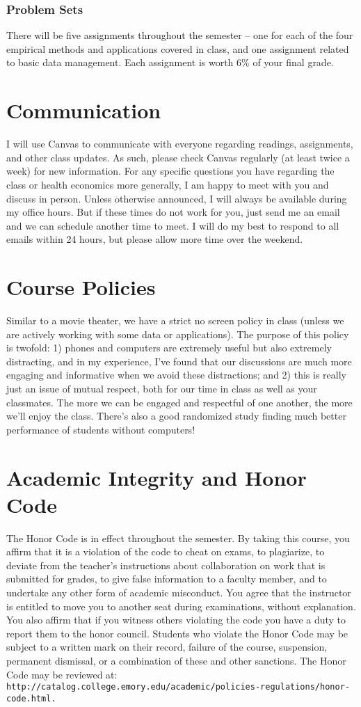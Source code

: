 \documentclass{article}
\begin{document}
\subsubsection*{Problem Sets}
There will be five assignments throughout the semester -- one for each of the four empirical methods and applications covered in class, and one assignment related to basic data management. Each assignment is worth 6\% of your final grade.

\section*{Communication}
I will use Canvas to communicate with everyone regarding readings, assignments, and other class updates. As such, please check Canvas regularly (at least twice a week) for new information. For any specific questions you have regarding the class or health economics more generally, I am happy to meet with you and discuss in person. Unless otherwise announced, I will always be available during my office hours. But if these times do not work for you, just send me an email and we can schedule another time to meet. I will do my best to respond to all emails within 24 hours, but please allow more time over the weekend.

\section*{Course Policies}
Similar to a movie theater, we have a strict no screen policy in class (unless we are actively working with some data or applications). The purpose of this policy is twofold: 1) phones and computers are extremely useful but also extremely distracting, and in my experience, I've found that our discussions are much more engaging and informative when we avoid these distractions; and 2) this is really just an issue of mutual respect, both for our time in class as well as your classmates. The more we can be engaged and respectful of one another, the more we'll enjoy the class. There's also a good randomized study finding much better performance of students without computers!

\section*{Academic Integrity and Honor Code}
The Honor Code is in effect throughout the semester. By taking this course, you affirm that it is a violation of the code to cheat on exams, to plagiarize, to deviate from the teacher's instructions about collaboration on work that is submitted for grades, to give false information to a faculty member, and to undertake any other form of academic misconduct. You agree that the instructor is entitled to move you to another seat during examinations, without explanation. You also affirm that if you witness others violating the code you have a duty to report them to the honor council. Students who violate the Honor Code may be subject to a written mark on their record, failure of the course, suspension, permanent dismissal, or a combination of these and other sanctions. The Honor Code may be reviewed at: \texttt{http://catalog.college.emory.edu/academic/policies-regulations/honor-code.html.}
\end{document}
